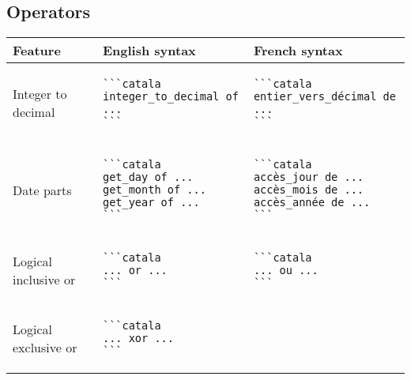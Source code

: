 \documentclass[a3paper,landscape]{article}
\begin{document}
\begin{multicols*}{2}
\section*{Operators}
\begin{center}
\begin{tabular}{p{}p{}p{}}
\toprule
Feature&English syntax&French syntax\\\midrule
Integer to decimal&
\vspace*{-1.75em}
\begin{verbatim}
```catala
integer_to_decimal of ...
```
\end{verbatim}
\vspace*{-1.75em}
&
\vspace*{-1.75em}
\begin{verbatim}
```catala
entier_vers_décimal de ...
```
\end{verbatim}
\vspace*{-1.75em}
\\
Date parts&
\vspace*{-1.75em}
\begin{verbatim}
```catala
get_day of ...
get_month of ...
get_year of ...
```
\end{verbatim}
\vspace*{-1.75em}
&
\vspace*{-1.75em}
\begin{verbatim}
```catala
accès_jour de ...
accès_mois de ...
accès_année de ...
```
\end{verbatim}
\vspace*{-1.75em}
\\
Logical inclusive or&
\vspace*{-1.75em}
\begin{verbatim}
```catala
... or ...
```
\end{verbatim}
\vspace*{-1.75em}
&
\vspace*{-1.75em}
\begin{verbatim}
```catala
... ou ...
```
\end{verbatim}
\vspace*{-1.75em}
\\
Logical exclusive or&
\vspace*{-1.75em}
\begin{verbatim}
```catala
... xor ...
```
\end{verbatim}
\vspace*{-1.75em}
&
\vspace*{-1.75em}

\end{tabular}
\end{center}
\end{multicols*}
\end{document}
